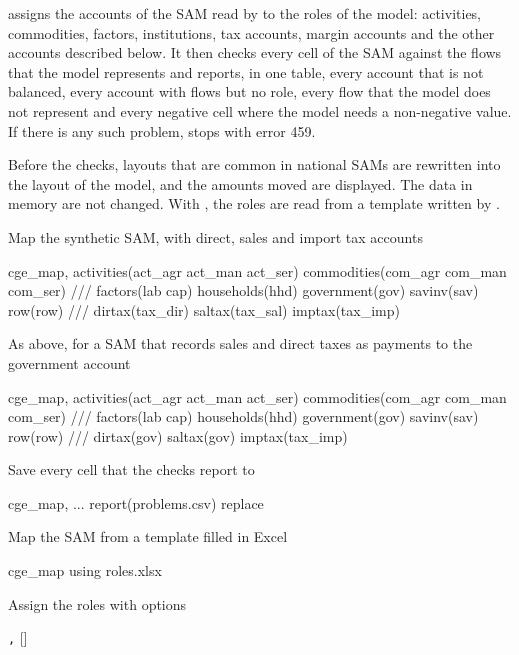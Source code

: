 

 assigns the accounts of the SAM read by  to the
roles of the model: activities, commodities, factors, institutions, tax
accounts, margin accounts and the other accounts described below. It then
checks every cell of the SAM against the flows that the model represents and
reports, in one table, every account that is not balanced, every account with
flows but no role, every flow that the model does not represent and every
negative cell where the model needs a non-negative value. If there is any such
problem,  stops with error 459.

Before the checks, layouts that are common in national SAMs are rewritten into
the layout of the model, and the amounts moved are displayed. The data in
memory are not changed. With , the roles are read from a template
written by .


Map the synthetic SAM, with direct, sales and import tax accounts
\begin{stcode}
cge_map, activities(act_agr act_man act_ser) commodities(com_agr com_man com_ser) ///
    factors(lab cap) households(hhd) government(gov) savinv(sav) row(row)        ///
    dirtax(tax_dir) saltax(tax_sal) imptax(tax_imp)
\end{stcode}
As above, for a SAM that records sales and direct taxes as payments to the
government account
\begin{stcode}
cge_map, activities(act_agr act_man act_ser) commodities(com_agr com_man com_ser) ///
    factors(lab cap) households(hhd) government(gov) savinv(sav) row(row)        ///
    dirtax(gov) saltax(gov) imptax(tax_imp)
\end{stcode}
Save every cell that the checks report to 
\begin{stcode}
cge_map, ... report(problems.csv) replace
\end{stcode}
Map the SAM from a template filled in Excel
\begin{stcode}
cge_map using roles.xlsx
\end{stcode}


Assign the roles with options

\begin{stsyntax}
\texttt{,} 
 
 
  []
\end{stsyntax}

